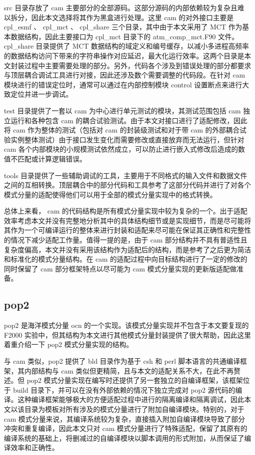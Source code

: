 src 目录存放了 cam 主要部分的全部源码。这部分源码的内部依赖较为复杂且难以拆分，因此本文选择将其作为黑盒进行处理。这里 cam 的对外接口主要是 cpl\_esmf 、 cpl\_mct 、 cpl\_share 三个目录，其中由于本文采用了 MCT 作为基本数据结构，因此主要接口为 cpl\_mct 目录下的 atm\_comp\_mct.F90 文件。 cpl\_share 目录提供了 MCT 数据结构的域定义和编号缓存，以减小多进程高频率的数据结构访问下带来的字符串操作对应延迟，最大化运行效率。这两个目录是本文封装过程中主要需要处理的部分。另外，代码各个涉及到错误处理的部分都要求与顶层耦合调试工具进行对接，因此还涉及数个需要调整的代码段。在针对 cam 模块进行的错误定位时，通常可以通过在内部控制模块 control 设置断点来进行大致定位并进一步调试。

test 目录提供了一套以 cam 为中心进行单元测试的模块，其测试范围包括 cam 独立运行和各种包含 cam 的耦合试验测试。由于本文对接口进行了适配修改，因此将 cam 作为整体的测试（包括对 cam 的封装级测试和对于带 cam 的外部耦合试验实例整体测试）由于接口发生变化而需要修改或直接放弃而无法运行，但针对 cam 各个内部模块的小规模测试依然成立，可以防止进行嵌入式修改后造成的数值不匹配或计算逻辑错误。

tools 目录提供了一些辅助调试的工具，主要用于不同格式的输入文件和数据文件之间的互相转换。顶层耦合中的部分代码和工具参考了这部分代码并进行了对各个模式分量的适配使得他们可以用于全部的模式分量实现中的格式转换。

总体上来看， cam 的代码结构是所有模式分量实现中较为复杂的一个。出于适配效率考虑本文并没有完整地分析其中的具体结构细节或是实现细节，而是尽可能将其作为一个可编译运行的整体来进行封装和适配来尽可能在保证其正确性和完整性的情况下减少适配工作量。值得一提的是，由于 cam 部分结构并不具有普适性且复杂度偏高，本文并没有采用该结构作为适配后的结构，而是参考了之后更为简洁和标准化的模式分量结构。在 cam 的适配过程中向目标结构进行了一定的修改的同时保留了 cam 部分框架特点以尽可能为 cam 模式分量实现的更新版适配做准备。

\subsection{pop2}

pop2 \cite{POP2doc} \cite{POP2faq}是海洋模式分量 ocn 的一个实现。该模式分量实现并不包含于本文要复现的 F2000 实验中，但其结构为本文进行其他模式分量封装提供了很大帮助，因此这里着重介绍一下 pop2 模式分量实现的结构。

与 cam 类似，pop2 提供了 bld 目录作为基于 csh 和 perl 脚本语言的共通编译框架，其内部结构与 cam 类似但更精简，且与本文的适配关系不大，在此不再赘述。但 pop2 模式分量实现在编写时还提供了另一套独立的自编译框架，该框架位于 build 目录下，并可以在没有外部依赖的情况下独立完成对 pop2 源代码的编译。这种编译框架能够极大的方便适配过程中进行的隔离编译和隔离调试，因此本文以该目录为模板对所有涉及的模式分量进行了附加自编译模块。特别的，对于 cam 模式分量来说，其编译系统较为复杂，直接插入附加自编译模块导致了部分冲突和重复编译，因此本文只对 cam 模式分量进行了特殊适配，保留了其原有的编译系统的基础上，将删减过的自编译模块以脚本调用的形式附加，从而保证了编译效率和正确性。

